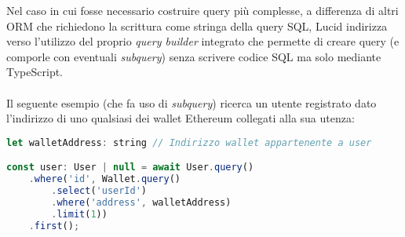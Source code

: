 Nel caso in cui fosse necessario costruire query più complesse, a differenza di altri ORM che richiedono la scrittura come stringa della query SQL, Lucid indirizza verso l'utilizzo del proprio \textit{query builder} integrato che permette di creare query (e comporle con eventuali \textit{subquery}) senza scrivere codice SQL ma solo mediante TypeScript.
\\\\
Il seguente esempio (che fa uso di \textit{subquery}) ricerca un utente registrato dato l'indirizzo di uno qualsiasi dei wallet Ethereum collegati alla sua utenza:
\begin{lstlisting}[language=JavaScript]
let walletAddress: string // Indirizzo wallet appartenente a user

const user: User | null = await User.query()
    .where('id', Wallet.query()
        .select('userId')
        .where('address', walletAddress)
        .limit(1))
    .first();
\end{lstlisting}
